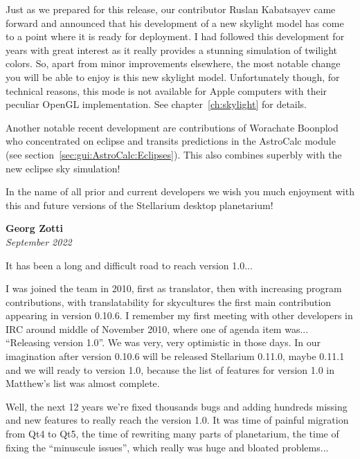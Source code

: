 Just as we prepared for this release, our contributor Ruslan
Kabatsayev came forward and announced that his development of a new skylight
model has come to a point where it is ready for deployment. I had
followed this development for years with great interest as it really
provides a stunning simulation of twilight colors. So, apart from minor
improvements elsewhere, the most notable change you will be able to
enjoy is this new skylight model. Unfortunately though, for technical
reasons, this mode is not available for Apple computers with their
peculiar OpenGL implementation.  See chapter~\ref{ch:skylight} for
details.

Another notable recent development are contributions of Worachate
Boonplod who concentrated on eclipse and transits predictions in the AstroCalc
module (see section~\ref{sec:gui:AstroCalc:Eclipses}).  This also
combines superbly with the new eclipse sky simulation!

\vspace{2\baselineskip}



\noindent In the name of all prior and current developers we wish you much enjoyment with
this and future versions of the Stellarium desktop planetarium!


\vspace{2\baselineskip}

\begin{flushright}
\textbf{Georg Zotti} \\ \emph{September 2022}
\end{flushright}

\vspace{2\baselineskip}

It has been a long and difficult road to reach version 1.0...

I was joined the team in 2010, first as translator, then with increasing program contributions, with translatability for skycultures the first main contribution appearing in version 0.10.6. I remember my first meeting with other developers in IRC around middle of November 2010, where one of agenda item was... ``Releasing version 1.0''. We was very, very optimistic in those days. In our imagination after version 0.10.6 will be released Stellarium 0.11.0, maybe 0.11.1 and we will ready to version 1.0, because the list of features for version 1.0 in Matthew's list was almost complete. 

Well, the next 12 years we're fixed thousands bugs and adding hundreds missing and new features to really reach the version 1.0. It was time of painful migration from Qt4 to Qt5, the time of rewriting many parts of planetarium, the time of fixing the ``minuscule issues'', which really was huge and bloated problems...

